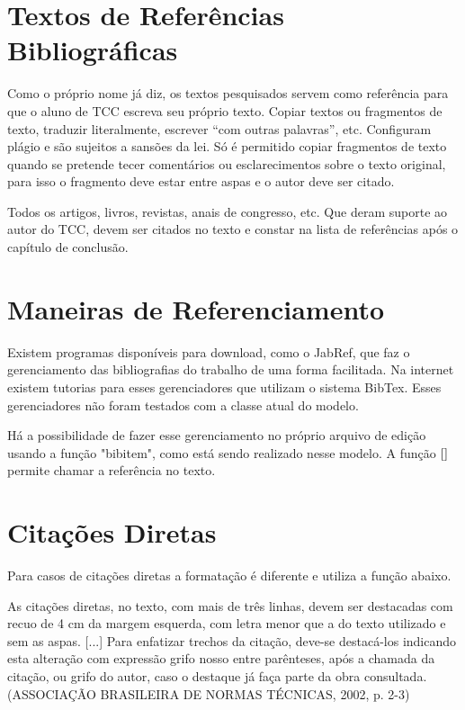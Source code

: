 \documentclass[
        oneside,      %
        english,			
        brazil			 
        ]{configcefetmglpd}
\begin{document}
\section{Textos de Referências Bibliográficas}
Como o próprio nome já diz, os textos pesquisados servem como referência para que o aluno de TCC escreva seu próprio texto. Copiar textos ou fragmentos de texto, traduzir literalmente, escrever “com outras palavras”, etc. Configuram plágio e são sujeitos a sansões da lei. Só é permitido copiar fragmentos de texto quando se pretende tecer comentários ou esclarecimentos sobre o texto original, para isso o fragmento deve estar entre aspas e o autor deve ser citado.

Todos os artigos, livros, revistas, anais de congresso, etc. Que deram suporte ao autor do TCC, devem ser citados no texto e constar na lista de referências após o capítulo de conclusão.

\section{Maneiras de Referenciamento}
Existem programas disponíveis para download, como o JabRef, que faz o gerenciamento das bibliografias do trabalho de uma forma facilitada. Na internet existem tutorias para esses gerenciadores que utilizam o sistema BibTex. Esses gerenciadores não foram testados com a classe atual do modelo.

Há a possibilidade de fazer esse gerenciamento no próprio arquivo de edição usando a função "bibitem", como está sendo realizado nesse modelo. A função $\cite{}$ permite chamar a referência no texto.

\section{Citações Diretas}
Para casos de citações diretas a formatação é diferente e utiliza a função abaixo.

\begin{citacao}
	As cita\c{c}\~oes diretas, no texto, com mais de tr\^es linhas, devem ser destacadas 
	com recuo de 4 cm da margem esquerda, com letra menor que a do texto utilizado 
	e sem as aspas. [...] Para enfatizar trechos da cita\c{c}\~ao, deve-se destac\'a-los indicando esta 
	altera\c{c}\~ao com express\~ao grifo nosso entre par\^enteses, ap\'os a chamada da cita\c{c}\~ao, ou grifo 
	do autor, caso o destaque j\'a fa\c{c}a parte da obra consultada. (ASSOCIA\c{C}\~AO BRASILEIRA DE NORMAS 
	T\'ECNICAS, 2002, p. 2-3)
\end{citacao}
\end{document}

